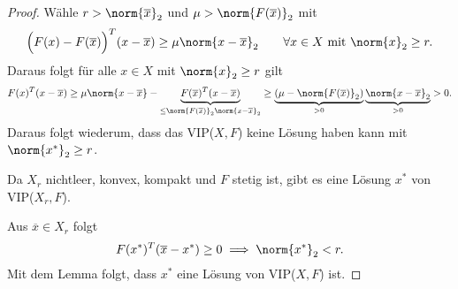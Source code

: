 \begin{proof}
	Wähle $r > \norm{\overline{x}}_{2} $ und $\mu > \norm{F(\overline{x})} _{2}$ mit
	\[
		\Big( F(x) - F(\overline{x}) \Big) ^{T}(x-\overline{x}) \geq  \mu  \norm{x -\overline{x}} _{2} \qquad \forall x \in X \text{ mit } \norm{x} _{2} \geq  r
	.\] 
	Daraus folgt für alle $x \in X$ mit $\norm{x} _{2}\geq r$ gilt
	\[
		F(x)^{T}(x-\overline{x}) \geq  \mu \norm{x-\overline{x}} - \underbrace{F(\overline{x})^{T}(x-\overline{x})}_{\leq \norm{F(\overline{x})} _{2}\norm{x-\overline{x}} _{2}} \geq \underbrace{(\mu -\norm{F(\overline{x})} _{2})}_{>0} \underbrace{\norm{x-\overline{x}} _{2}}_{>0} >0
	.\] 
	Daraus folgt wiederum, dass das VIP($X,F$) keine Lösung haben kann mit $\norm{{x}^{*}} _{2}\geq  r$.

	Da $X_{r}$ nichtleer, konvex, kompakt und $F$ stetig ist, gibt es eine Lösung ${x}^{*}$ von VIP($X_{r},F$).

	Aus $\overline{x} \in X_{r}$ folgt
	\[
		F({x}^{*})^{T}(\overline{x}-{x}^{*})\geq 0 \implies \norm{{x}^{*}} _{2}< r
	.\] 
	Mit dem Lemma folgt, dass ${x}^{*}$ eine Lösung von VIP($X,F$) ist.
\end{proof}
